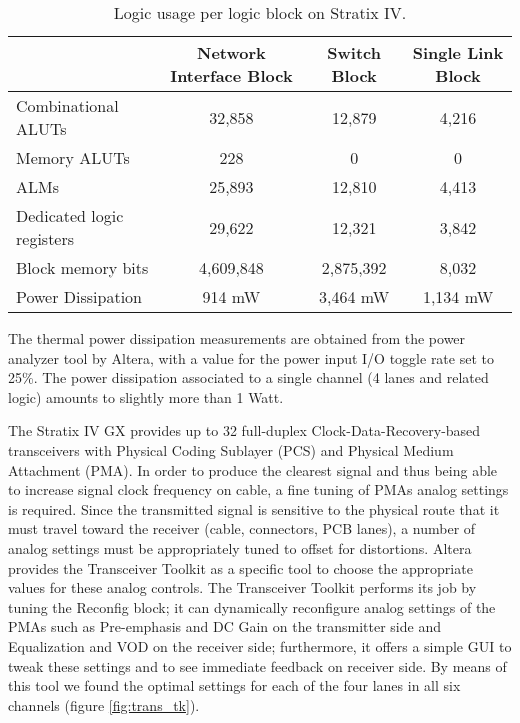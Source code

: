\begin{table}[htbp]
\centering
\begin{tabular}{|l|c|c|c|}
\hline
\hline
 & Network Interface Block & Switch Block & Single Link Block\\
\hline 
Combinational ALUTs       & 32,858    & 12,879    & 4,216   \\
Memory ALUTs              & 228       & 0         & 0       \\
ALMs                      & 25,893    & 12,810    & 4,413   \\
Dedicated logic registers & 29,622    & 12,321    & 3,842   \\
Block memory bits         & 4,609,848 & 2,875,392 &  8,032  \\
Power Dissipation         & 914 mW    &  3,464 mW & 1,134 mW\\
\hline
\hline
\end{tabular}
\caption{Logic usage per logic block on Stratix IV.}
\label{tab:synt_block}
\end{table}


The thermal power dissipation measurements are obtained from the power
analyzer tool by Altera, with a value for the power input I/O toggle
rate set to 25\%. The power dissipation associated to a single channel
(4 lanes and related logic) amounts to slightly more than 1
Watt.

The Stratix IV GX provides up to 32 full-duplex
Clock-Data-Recovery-based transceivers with Physical Coding Sublayer
(PCS) and Physical Medium Attachment (PMA). In order to produce the
clearest signal and thus being able to increase signal clock frequency
on cable, a fine tuning of PMAs analog settings is required. Since the
transmitted signal is sensitive to the physical route that it must
travel toward the receiver (cable, connectors, PCB lanes), a number of
analog settings must be appropriately tuned to offset for distortions.
Altera provides the Transceiver Toolkit as a specific tool to choose
the appropriate values for these analog controls. The Transceiver
Toolkit performs its job by tuning the Reconfig block; it can
dynamically reconfigure analog settings of the PMAs such as
Pre-emphasis and DC Gain on the transmitter side and Equalization and
VOD on the receiver side; furthermore, it offers a simple GUI to tweak
these settings and to see immediate feedback on receiver side. By
means of this tool we found the optimal settings for each of the four
lanes in all six channels (figure \ref{fig:trans_tk}).


